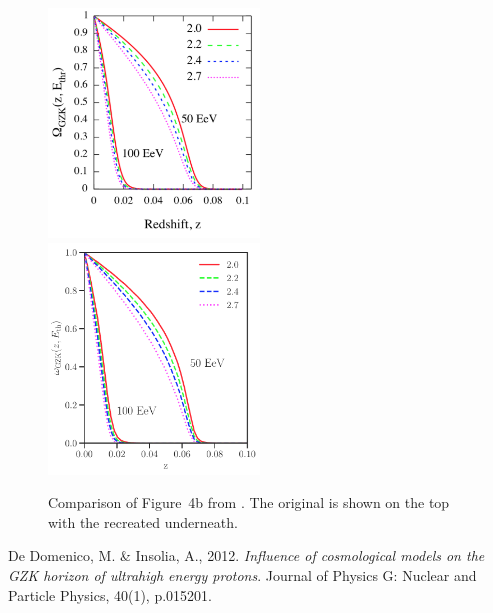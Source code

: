 \documentclass[fontsize=12pt]{article}
\begin{document}
\begin{figure}
\centering
\includegraphics[width=0.5\textwidth]{figures/fig4b_original.png}
\includegraphics[width=0.5\textwidth]{figures/Fig4b_MD2012.pdf}
 \caption{Comparison of Figure~4b from \cite{MD2012}. The original is shown on the top with the recreated underneath.}
 \label{fig4bcomp}
\end{figure}


\begin{thebibliography}{9}

De Domenico, M. \& Insolia, A., 2012. \emph{Influence of cosmological models on the GZK horizon of ultrahigh energy protons}. Journal of Physics G: Nuclear and Particle Physics, 40(1), p.015201.

\end{thebibliography}
\end{document}
